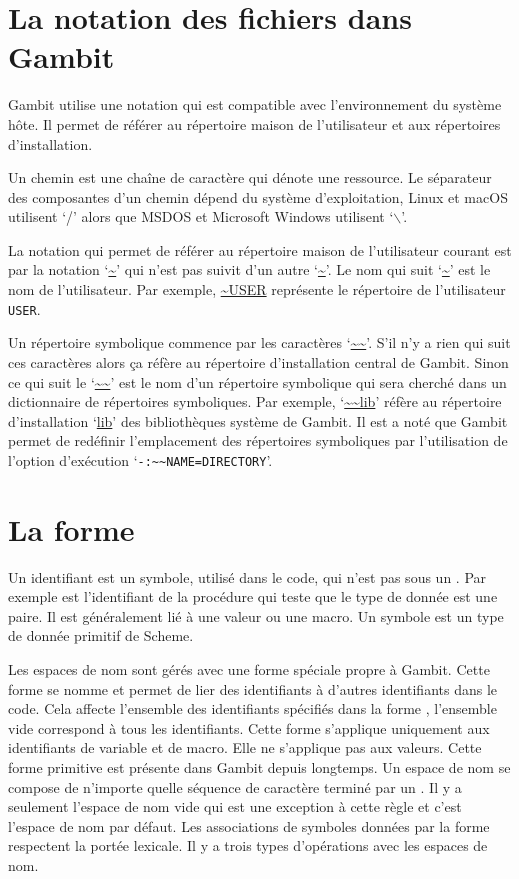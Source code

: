 \section{La notation des fichiers dans Gambit}
Gambit utilise une notation qui est compatible avec l'environnement du
système hôte. Il permet de référer au répertoire maison de l'utilisateur
et aux répertoires d'installation.

Un chemin est une chaîne de caractère qui dénote une ressource.
Le séparateur des composantes d'un chemin dépend du système
d'exploitation, Linux et macOS utilisent `/' alors que MSDOS et
Microsoft Windows utilisent `$\backslash$'.

La notation qui permet de référer au répertoire maison de l'utilisateur courant
est par la notation `\url{~}' qui n'est pas suivit d'un autre `\url{~}'.  Le
nom qui suit `\url{~}' est le nom de l'utilisateur. Par exemple, \url{~USER}
représente le répertoire de l'utilisateur {\tt USER}.

Un répertoire symbolique commence par les caractères `\url{~~}'. S'il n'y a
rien qui suit ces caractères alors ça réfère au répertoire d'installation
central de Gambit.  Sinon ce qui suit le `\url{~~}' est le nom d'un répertoire
symbolique qui sera cherché dans un dictionnaire de répertoires symboliques.
Par exemple, `\url{~~lib}' réfère au répertoire d'installation `\url{lib}' des
bibliothèques système de Gambit. Il est a noté que Gambit permet de redéfinir
l'emplacement des répertoires symboliques par l'utilisation de l'option
d'exécution `\verb|-:~~NAME=DIRECTORY|'.

\section{La forme }

Un identifiant est un symbole, utilisé dans le code, qui n'est pas sous un
. Par exemple  est l'identifiant de la procédure
qui teste que le type de donnée est une paire. Il est généralement lié à une
valeur ou une macro. Un symbole est un type de donnée primitif de Scheme.

Les espaces de nom sont gérés avec une forme spéciale propre à Gambit. Cette
forme se nomme  et permet de lier des identifiants à
d'autres identifiants dans le code. Cela affecte l'ensemble des identifiants
spécifiés dans la forme , l'ensemble vide correspond à
tous les identifiants. Cette forme s'applique uniquement aux identifiants de
variable et de macro. Elle ne s'applique pas aux valeurs.  Cette forme
primitive est présente dans Gambit depuis longtemps.  Un espace de nom se
compose de n'importe quelle séquence de caractère terminé par un \lstcode{#}.
Il y a seulement l'espace de nom vide qui est une exception à cette règle et
c'est l'espace de nom par défaut.  Les associations de symboles données par la
forme  respectent la portée lexicale. Il y a trois types
d'opérations avec les espaces de nom.

